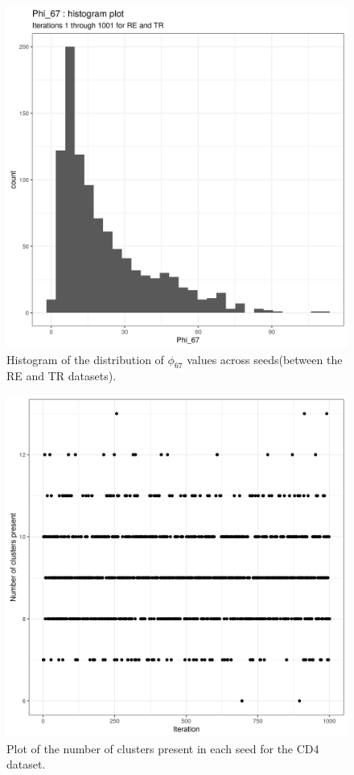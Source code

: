 \documentclass[12pt]{article} %
\begin{document}
	\begin{figure}[h]
		\centering
		\includegraphics[scale=0.75]{Images/Biology_data/Set_250/All_datasets/Phi_histograms/Phi_67_histogram_plot.png}
		\caption{Histogram of the distribution of $\phi_{67}$ values across seeds(between the RE and TR datasets).}
		\label{fig:results:cedar_1:mdi_re_tr_phi_histogram}
	\end{figure}
	
	\newpage


	\begin{figure}[h]
		\centering
		\includegraphics[scale=0.75]{Images/Biology_data/Set_250/All_datasets/Cluster_series_plots/CD4.png}
		\caption{Plot of the number of clusters present in each seed for the CD4 dataset.}
		\label{fig:results:cedar_1:mdi_cd4_number_clusters_plot}
	\end{figure}
	
\end{document}
